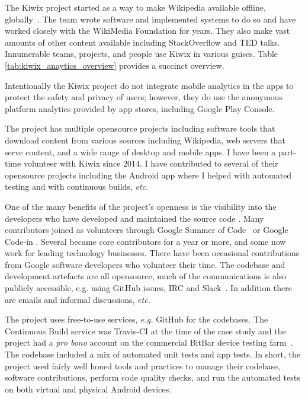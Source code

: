 The Kiwix project started as a way to make Wikipedia available offline, globally~. The team wrote software and implemented systems to do so and have worked closely with the WikiMedia Foundation for years. They also make vast amounts of other content available including StackOverflow and TED talks. Innumerable teams, projects, and people use Kiwix in various guises. Table \ref{tab:kiwix_anaytics_overview} provides a succinct overview.

Intentionally the Kiwix project do not integrate mobile analytics in the apps to protect the safety and privacy of users; however, they do use the anonymous platform analytics provided by app stores, including Google Play Console.

The project has multiple opensource projects including software tools that download content from various sources including Wikipedia, web servers that serve content, and a wide range of desktop and mobile apps. I have been a part-time volunteer with Kiwix since 2014. I have contributed to several of their opensource projects including the Android app where I helped with automated testing and with continuous builds, \emph{etc.} %

One of the many benefits of the project’s openness is the visibility into the developers who have developed and maintained the source code . Many contributors joined as volunteers through Google Summer of Code~ or Google Code-in . Several became core contributors for a year or more, and some now work for leading technology businesses. There have been occasional contributions from Google software developers who volunteer their time. The codebase and development artefacts are all opensource, much of the communications is also publicly accessible, e.g. using GitHub issues, IRC and Slack~. In addition there are emails and informal discussions, \emph{etc.}

The project uses free-to-use services, \emph{e.g.} GitHub for the codebases. The Continuous Build service was Travis-CI at the time of the case study  and the project had a \emph{pro bono} account on the commercial BitBar device testing farm~. The codebase included a mix of automated unit tests and app tests. In short, the project used fairly well honed tools and practices to manage their codebase, software contributions, perform code quality checks, and run the automated tests on both virtual and physical Android devices.

